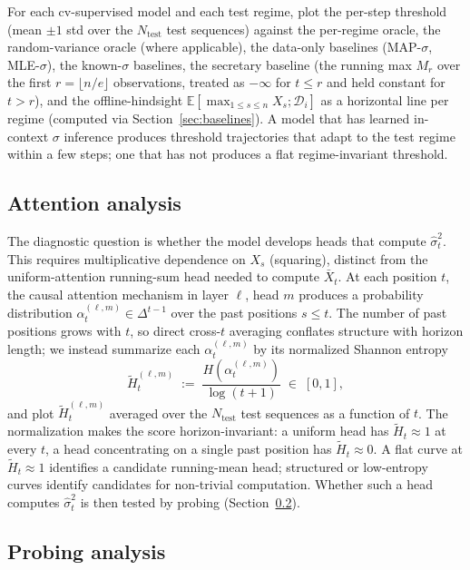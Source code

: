\documentclass[11pt]{article}
\begin{document}
For each cv-supervised model and each test regime, plot the per-step threshold (mean $\pm 1$ std over the $N_{\mathrm{test}}$ test sequences) against the per-regime oracle, the random-variance oracle (where applicable), the data-only baselines (MAP-$\sigma$, MLE-$\sigma$), the known-$\sigma$ baselines, the secretary baseline (the running max $M_r$ over the first $r = \lfloor n/e \rfloor$ observations, treated as $-\infty$ for $t \le r$ and held constant for $t > r$), and the offline-hindsight $\mathbb{E}[\max_{1 \le s \le n} X_s; \mathcal{D}_i]$ as a horizontal line per regime (computed via Section~\ref{sec:baselines}). A model that has learned in-context $\sigma$ inference produces threshold trajectories that adapt to the test regime within a few steps; one that has not produces a flat regime-invariant threshold.

\subsection{Attention analysis}
\label{sec:exp-attn}

The diagnostic question is whether the model develops heads that compute $\hat\sigma_t^2$. This requires multiplicative dependence on $X_s$ (squaring), distinct from the uniform-attention running-sum head needed to compute $\bar X_t$. At each position $t$, the causal attention mechanism in layer $\ell$, head $m$ produces a probability distribution $\alpha_t^{(\ell,m)} \in \Delta^{t-1}$ over the past positions $s \le t$. The number of past positions grows with $t$, so direct cross-$t$ averaging conflates structure with horizon length; we instead summarize each $\alpha_t^{(\ell,m)}$ by its normalized Shannon entropy
\[
\widetilde H_t^{(\ell, m)} \;:=\; \frac{H(\alpha_t^{(\ell, m)})}{\log(t+1)} \;\in\; [0, 1],
\]
and plot $\widetilde H_t^{(\ell, m)}$ averaged over the $N_{\mathrm{test}}$ test sequences as a function of $t$. The normalization makes the score horizon-invariant: a uniform head has $\widetilde H_t \approx 1$ at every $t$, a head concentrating on a single past position has $\widetilde H_t \approx 0$. A flat curve at $\widetilde H_t \approx 1$ identifies a candidate running-mean head; structured or low-entropy curves identify candidates for non-trivial computation. Whether such a head computes $\hat\sigma_t^2$ is then tested by probing (Section~\ref{sec:exp-probe}).

\subsection{Probing analysis}
\label{sec:exp-probe}
\end{document}
